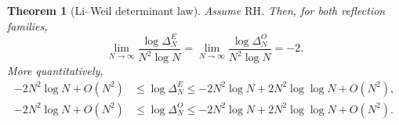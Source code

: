 \documentclass[11pt]{amsart}
\numberwithin{equation}{section}
\theoremstyle{plain}
\newtheorem{theorem}{Theorem}[section]
\theoremstyle{definition}
\theoremstyle{remark}
\newcommand{\RH}{\mathrm{RH}}
\begin{document}
\begin{theorem}[Li--Weil determinant law]
\label{thm:determinant_first_order}
Assume $\RH$. Then, for both reflection families,
\begin{equation}
\boxed{
\lim_{N\to\infty}
\frac{\log\Delta_N^E}{N^2\log N}
=
\lim_{N\to\infty}
\frac{\log\Delta_N^O}{N^2\log N}
=-2.}
\label{eq:determinant_first_order_limit}
\end{equation}
More quantitatively,
\begin{align}
-2N^2\log N+O(N^2)
&\le \log\Delta_N^E
\le -2N^2\log N+2N^2\log\log N+O(N^2),
\label{eq:E_determinant_two_sided}\\
-2N^2\log N+O(N^2)
&\le \log\Delta_N^O
\le -2N^2\log N+2N^2\log\log N+O(N^2).
\label{eq:O_determinant_two_sided}
\end{align}
\end{theorem}
\end{document}
